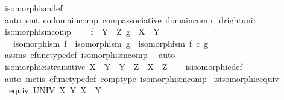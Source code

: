 \begin{isabellebody}
\ isomorphism{\isacharunderscore}{\kern0pt}def\ \isamarkupfalse%
\ {\isacharparenleft}{\kern0pt}auto{\isacharcomma}{\kern0pt}\ smt\ codomain{\isacharunderscore}{\kern0pt}comp\ comp{\isacharunderscore}{\kern0pt}associative\ domain{\isacharunderscore}{\kern0pt}comp\ id{\isacharunderscore}{\kern0pt}right{\isacharunderscore}{\kern0pt}unit{\isacharparenright}{\kern0pt}%
\endisatagproof
{\isafoldproof}%
%
\isadelimproof
\isanewline
%
\endisadelimproof
\isanewline
{}\isamarkupfalse%
\ isomorphism{\isacharunderscore}{\kern0pt}comp{\isacharprime}{\kern0pt}{\isacharcolon}{\kern0pt}\ \isanewline
\ \ \ {\isachardoublequoteopen}f\ {\isacharcolon}{\kern0pt}\ Y\ {\isasymrightarrow}\ Z{\isachardoublequoteclose}\ {\isachardoublequoteopen}g\ {\isacharcolon}{\kern0pt}\ X\ {\isasymrightarrow}\ Y{\isachardoublequoteclose}\isanewline
\ \ \ {\isachardoublequoteopen}isomorphism\ f\ {\isasymLongrightarrow}\ isomorphism\ g\ {\isasymLongrightarrow}\ isomorphism\ {\isacharparenleft}{\kern0pt}f\ {\isasymcirc}\isactrlsub c\ g{\isacharparenright}{\kern0pt}{\isachardoublequoteclose}\isanewline
%
\isadelimproof
\ \ %
\endisadelimproof
%
\isatagproof
{}\isamarkupfalse%
\ assms\ cfunc{\isacharunderscore}{\kern0pt}type{\isacharunderscore}{\kern0pt}def\ isomorphism{\isacharunderscore}{\kern0pt}comp\ \isamarkupfalse%
\ auto%
\endisatagproof
{\isafoldproof}%
%
\isadelimproof
\isanewline
%
\endisadelimproof
\isanewline
{}\isamarkupfalse%
\ isomorphic{\isacharunderscore}{\kern0pt}is{\isacharunderscore}{\kern0pt}transitive{\isacharcolon}{\kern0pt}\ {\isachardoublequoteopen}{\isacharparenleft}{\kern0pt}X\ {\isasymcong}\ Y\ {\isasymand}\ Y\ {\isasymcong}\ Z{\isacharparenright}{\kern0pt}\ {\isasymlongrightarrow}\ X\ {\isasymcong}\ Z{\isachardoublequoteclose}\isanewline
%
\isadelimproof
\ \ %
\endisadelimproof
%
\isatagproof
{}\isamarkupfalse%
\ is{\isacharunderscore}{\kern0pt}isomorphic{\isacharunderscore}{\kern0pt}def\ \isamarkupfalse%
\ {\isacharparenleft}{\kern0pt}auto{\isacharcomma}{\kern0pt}\ metis\ cfunc{\isacharunderscore}{\kern0pt}type{\isacharunderscore}{\kern0pt}def\ comp{\isacharunderscore}{\kern0pt}type\ isomorphism{\isacharunderscore}{\kern0pt}comp{\isacharparenright}{\kern0pt}%
\endisatagproof
{\isafoldproof}%
%
\isadelimproof
\isanewline
%
\endisadelimproof
\isanewline
{}\isamarkupfalse%
\ is{\isacharunderscore}{\kern0pt}isomorphic{\isacharunderscore}{\kern0pt}equiv{\isacharcolon}{\kern0pt}\isanewline
\ \ {\isachardoublequoteopen}equiv\ UNIV\ {\isacharbraceleft}{\kern0pt}{\isacharparenleft}{\kern0pt}X{\isacharcomma}{\kern0pt}\ Y{\isacharparenright}{\kern0pt}{\isachardot}{\kern0pt}\ X\ {\isasymcong}\ Y{\isacharbraceright}{\kern0pt}{\isachardoublequoteclose}\isanewline

\end{isabellebody}
